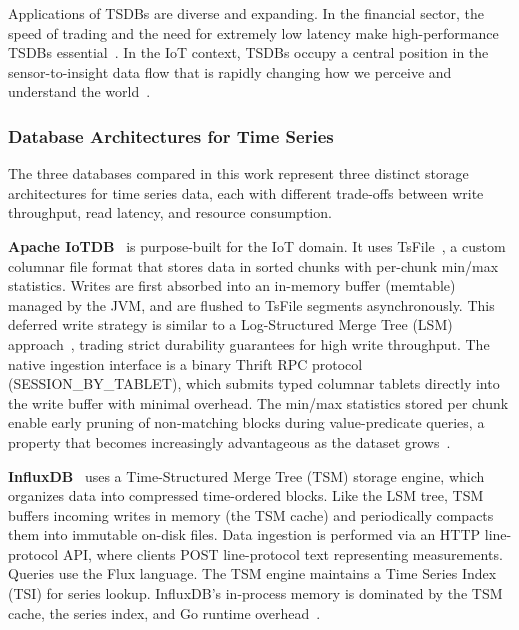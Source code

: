 Applications of TSDBs are diverse and expanding. In the financial sector, the speed of trading
and the need for extremely low latency make high-performance TSDBs essential~\citep{Dunning2014}.
In the IoT context, TSDBs occupy a central position in the sensor-to-insight data flow that is
rapidly changing how we perceive and understand the world~\citep{Dunning2014}.

\subsubsection{Database Architectures for Time Series}

The three databases compared in this work represent three distinct storage architectures for
time series data, each with different trade-offs between write throughput, read latency, and
resource consumption.

\textbf{Apache IoTDB}~\cite{wang2023iotdb} is purpose-built for the IoT domain. It uses TsFile~\citep{zhao2024tsfile},
a custom columnar file format that stores data in sorted chunks with per-chunk min/max statistics.
Writes are first absorbed into an in-memory buffer (memtable) managed by the JVM, and are
flushed to TsFile segments asynchronously. This deferred write strategy is similar to a
Log-Structured Merge Tree (LSM) approach~\citep{oneil1996lsm}, trading strict durability guarantees for high
write throughput. The native ingestion interface is a binary Thrift RPC protocol
(SESSION\_BY\_TABLET), which submits typed columnar tablets directly into the write buffer
with minimal overhead. The min/max statistics stored per chunk enable early pruning of
non-matching blocks during value-predicate queries, a property that becomes increasingly
advantageous as the dataset grows~\citep{wang2023iotdb}.

\textbf{InfluxDB}~\cite{naqvi2017influxdb} uses a Time-Structured Merge Tree (TSM) storage
engine, which organizes data into compressed time-ordered blocks. Like the LSM tree, TSM
buffers incoming writes in memory (the TSM cache) and periodically compacts them into
immutable on-disk files. Data ingestion is performed via an HTTP line-protocol API, where
clients POST line-protocol text representing measurements. Queries use the Flux language.
The TSM engine maintains a Time Series Index (TSI) for series lookup. InfluxDB's in-process
memory is dominated by the TSM cache, the series index, and Go runtime overhead~\citep{naqvi2017influxdb}.


